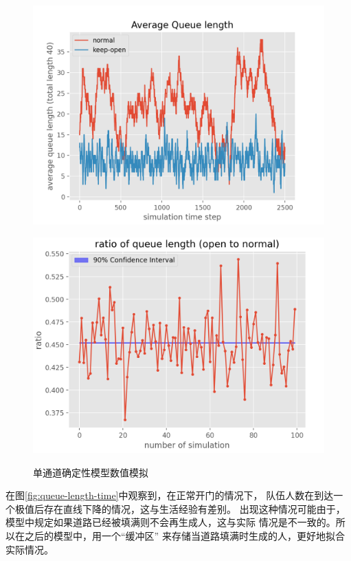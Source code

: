 \begin{figure}
    \centering
    \begin{minipage}[c]{0.45\textwidth}
        \centering
        \includegraphics[width=1.\textwidth]{images/队长-时间曲线.png}
        \label{fig:queue-length-time}
    \end{minipage}
    \begin{minipage}[c]{0.45\textwidth}
        \centering
        \includegraphics[width=1.\textwidth]{images/队长比例-时间曲线.png}
        \label{fig:length-ratio-time-curve}
    \end{minipage}
    \caption{单通道确定性模型数值模拟}
    \label{fig:one-lane-numerical-result}
\end{figure}
\par 在图\ref{fig:queue-length-time}中观察到，在正常开门的情况下，
队伍人数在到达一个极值后存在直线下降的情况，这与生活经验有差别。
出现这种情况可能由于，模型中规定如果道路已经被填满则不会再生成人，这与实际
情况是不一致的。所以在之后的模型中，用一个``缓冲区''
来存储当道路填满时生成的人，更好地拟合实际情况。
